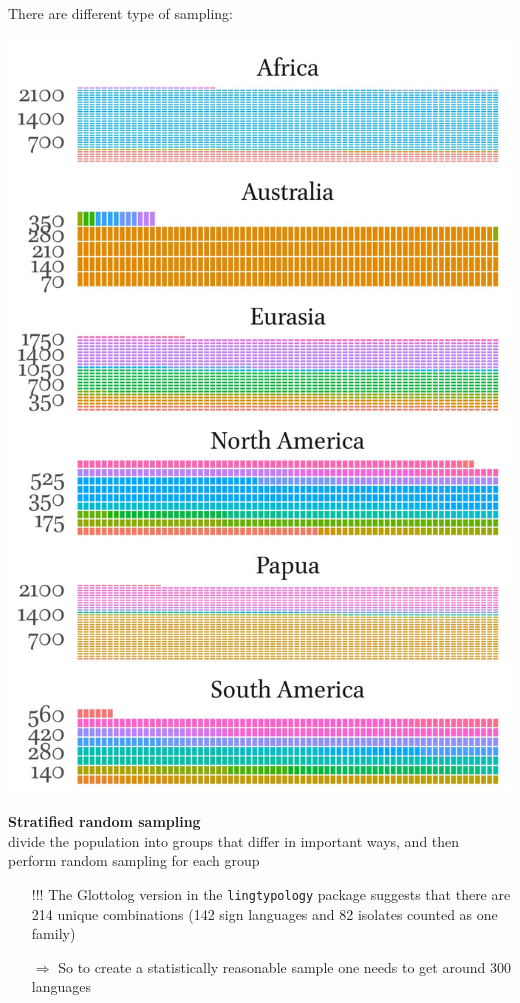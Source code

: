 \documentclass[13pt, t]{beamer}
\begin{document}
\begin{frame}{There are different type of sampling:}
\begin{multicols}{2}
\includegraphics[width=\linewidth]{images/05_families_by_area}
\columnbreak

\textbf{Stratified random sampling}\\
divide the population into groups that differ in important ways, and then perform random sampling for each group\pause\\
\begin{itemize}
\item[\color{colorblue}!!!] The Glottolog version in the \texttt{\small lingtypology} package suggests that there are \\ \alert{214 unique combinations} (142 sign languages and 82 isolates counted as one family) %
\pause
\item[\color{colorblue}$\Rightarrow$] So to create a statistically reasonable sample one needs to get around 300 languages
\end{itemize}
\end{multicols}
\end{frame}
\end{document}
